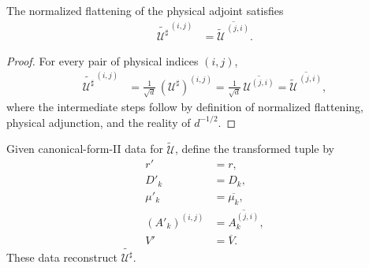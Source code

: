 \begin{lemma}
    \label{thm:mpu_physical_adjoint_normalized_flattening}
    \leanok
    The normalized flattening of the physical adjoint satisfies
    \begin{align}
        \widetilde{\mathcal U^\sharp}^{\,(i,j)}
         & =\overline{\widetilde{\mathcal U}^{\,(j,i)}}.
    \end{align}
\end{lemma}

\begin{proof}\leanok
    For every pair of physical indices $(i,j)$,
    \begin{align}
        \widetilde{\mathcal U^\sharp}^{\,(i,j)}
         & =\frac{1}{\sqrt d}\,(\mathcal U^\sharp)^{(i,j)}
        =\frac{1}{\sqrt d}\,\overline{\mathcal U^{(j,i)}}
        =\overline{\widetilde{\mathcal U}^{\,(j,i)}},
    \end{align}
    where the intermediate steps follow by definition of normalized flattening, physical
    adjunction, and the reality of $d^{-1/2}$.
\end{proof}

\begin{definition}
    \label{def:mpu_physical_adjoint_cfii_data}
    \leanok
    Given canonical-form-II data for $\widetilde{\mathcal U}$, define the
    transformed tuple by
    \begin{align}
        r'             & =r,                      \\
        D'_k           & =D_k,                    \\
        \mu'_k         & =\overline{\mu_k},       \\
        (A'_k)^{(i,j)} & =\overline{A_k^{(j,i)}}, \\
        V'             & =\overline V.
    \end{align}
    These data reconstruct $\widetilde{\mathcal U^\sharp}$.
\end{definition}

